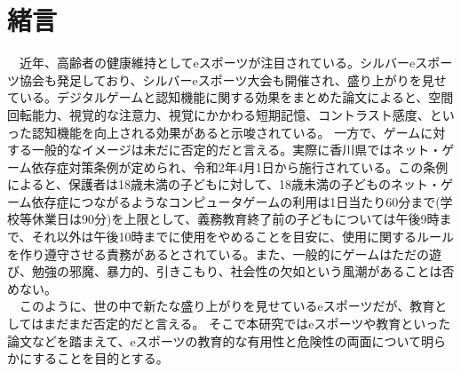 \section{緒言}

　近年、高齢者の健康維持としてeスポーツが注目されている。シルバーeスポーツ協会も発足しており、シルバーeスポーツ大会も開催され、盛り上がりを見せている。デジタルゲームと認知機能に関する効果をまとめた論文によると、空間回転能力、視覚的な注意力、視覚にかかわる短期記憶、コントラスト感度、といった認知機能を向上される効果があると示唆されている。
一方で、ゲームに対する一般的なイメージは未だに否定的だと言える。実際に香川県ではネット・ゲーム依存症対策条例が定められ、令和2年4月1日から施行されている。この条例によると、保護者は18歳未満の子どもに対して、18歳未満の子どものネット・ゲーム依存症につながるようなコンピュータゲームの利用は1日当たり60分まで(学校等休業日は90分)を上限として、義務教育終了前の子どもについては午後9時まで、それ以外は午後10時までに使用をやめることを目安に、使用に関するルールを作り遵守させる責務があるとされている。また、一般的にゲームはただの遊び、勉強の邪魔、暴力的、引きこもり、社会性の欠如という風潮があることは否めない。\\
　このように、世の中で新たな盛り上がりを見せているeスポーツだが、教育としてはまだまだ否定的だと言える。
そこで本研究ではeスポーツや教育といった論文などを踏まえて、eスポーツの教育的な有用性と危険性の両面について明らかにすることを目的とする。

